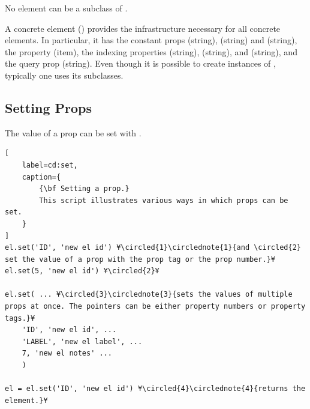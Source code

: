 \documentclass{tufte-handout}
\begin{document}
No element can be a subclass of .

A concrete element () provides the infrastructure necessary for all concrete elements. 
In particular, it has the constant props  (string),  (string) and  (string), the property  (item), the indexing properties  (string),  (string), and  (string), and the query prop  (string).
Even though it is possible to create instances of , typically one uses its subclasses.

\subsection{Setting Props}

The value of a prop can be set with .

\begin{lstlisting}[
	label=cd:set,
	caption={
		{\bf Setting a prop.}
		This script illustrates various ways in which props can be set.
	}
]
el.set('ID', 'new el id') ¥\circled{1}\circlednote{1}{and \circled{2} set the value of a prop with the prop tag or the prop number.}¥
el.set(5, 'new el id') ¥\circled{2}¥

el.set( ... ¥\circled{3}\circlednote{3}{sets the values of multiple props at once. The pointers can be either property numbers or property tags.}¥
	'ID', 'new el id', ...
	'LABEL', 'new el label', ...
	7, 'new el notes' ...
	) 

el = el.set('ID', 'new el id') ¥\circled{4}\circlednote{4}{returns the element.}¥
\end{lstlisting}
\end{document}
